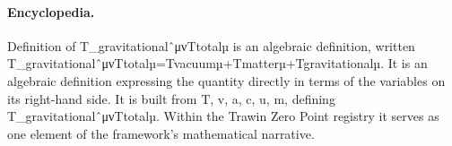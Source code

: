 \paragraph{Encyclopedia.}
Definition of T\_gravitationalˆμνTtotalµ is an algebraic definition, written T\_gravitationalˆμνTtotalµ=Tvacuumµ+Tmatterµ+Tgravitationalµ. It is an algebraic definition expressing the quantity directly in terms of the variables on its right-hand side. It is built from T, v, a, c, u, m, defining T\_gravitationalˆμνTtotalµ. Within the Trawin Zero Point registry it serves as one element of the framework's mathematical narrative.

